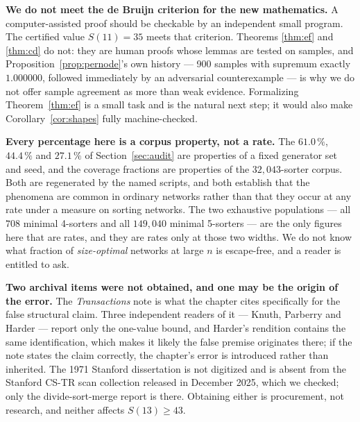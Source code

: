 \documentclass[11pt,a4paper]{article}
\begin{document}
\textbf{We do not meet the de Bruijn criterion for the new mathematics.} A
computer-assisted proof should be checkable by an independent small program.
The certified value $S(11) = 35$ meets that criterion. Theorems
\ref{thm:ef} and \ref{thm:cd} do not: they are human proofs whose lemmas are
tested on samples, and Proposition~\ref{prop:pernode}'s own history --- 900
samples with supremum exactly $1.000000$, followed immediately by an adversarial
counterexample --- is why we do not offer sample agreement as more than weak
evidence. Formalizing Theorem~\ref{thm:ef} is a small task and is the natural
next step; it would also make Corollary~\ref{cor:shapes} fully machine-checked.

\textbf{Every percentage here is a corpus property, not a rate.} The
$61.0\,\%$, $44.4\,\%$ and $27.1\,\%$ of Section~\ref{sec:audit} are properties
of a fixed generator set and seed, and the coverage fractions are properties of
the $32{,}043$-sorter corpus. Both are regenerated by the named scripts, and
both establish that the phenomena are common in ordinary networks rather than
that they occur at any rate under a measure on sorting networks. The two
exhaustive populations --- all $708$ minimal 4-sorters and all $149{,}040$
minimal 5-sorters --- are the only figures here that are rates, and they are
rates only at those two widths. We do not know what fraction of
\emph{size-optimal} networks at large $n$ is escape-free, and a reader is
entitled to ask.

\textbf{Two archival items were not obtained, and one may be the origin of the
error.} The \emph{Transactions} note \cite{VV72a} is what the chapter cites
specifically for the false structural claim. Three independent readers of it ---
Knuth, Parberry \cite{Pa89} and Harder --- report only the one-value bound, and
Harder's rendition contains the same identification, which makes it likely the
false premise originates there; if the note states the claim correctly, the
chapter's error is introduced rather than inherited. The 1971 Stanford
dissertation \cite{VV71} is not digitized and is absent from the Stanford CS-TR
scan collection released in December 2025, which we checked; only the
divide-sort-merge report \cite{VV71b} is there. Obtaining either is
procurement, not research, and neither affects $S(13) \ge 43$.
\end{document}
